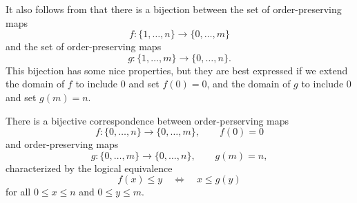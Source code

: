 It also follows from  that there is a bijection between the set of order-preserving maps
\begin{equation*}
  f:\{1,\ldots,n\}\to\{0,\ldots,m\}
\end{equation*}
and the set of order-preserving maps
\begin{equation*}
  g:\{1,\ldots,m\}\to\{0,\ldots,n\}.
\end{equation*}
This bijection has some nice properties, but they are best expressed if we extend the domain of $f$ to include $0$ and set $f(0)=0$, and the domain of $g$ to include $0$ and set $g(m)=n$.

\begin{theorem}\label{corollary:transposing-order-preserving-maps}
  There is a bijective correspondence between order-perserving maps
  \begin{equation*}
    f:\{0,\ldots,n\}\to\{0,\ldots,m\},\qquad f(0)=0
  \end{equation*}
  and order-preserving maps
  \begin{equation*}
    g:\{0,\ldots,m\}\to\{0,\ldots,n\},\qquad g(m)=n,
  \end{equation*}
  characterized by the logical equivalence
  \begin{equation}\label{equation:transposing-order-preserving-maps}
    f(x)\leq y\quad\Leftrightarrow\quad x\leq g(y) \tag{\textasteriskcentered}
  \end{equation}
  for all $0\leq x\leq n$ and $0\leq y\leq m$.
\end{theorem}

